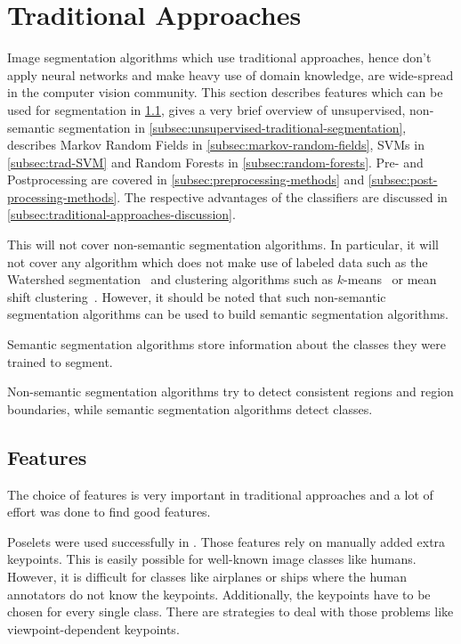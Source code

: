 
\newcommand\independent{\protect\mathpalette{\protect\independenT}{\perp}}
\def\independenT#1#2{\mathrel{\rlap{$#1#2$}\mkern2mu{#1#2}}}

\section{Traditional Approaches}\label{sec:traditional-approaches}%
Image segmentation algorithms which use traditional approaches, hence don't
apply neural networks and make heavy use of domain knowledge, are wide-spread
in the computer vision community. This section describes features which can be
used for segmentation in \cref{subsec:features}, gives a very brief overview of
unsupervised, non-semantic segmentation in
\cref{subsec:unsupervised-traditional-segmentation}, describes Markov Random
Fields in \cref{subsec:markov-random-fields}, \glspl{SVM} in
\cref{subsec:trad-SVM} and Random Forests in \cref{subsec:random-forests}.
Pre- and Postprocessing are covered in \cref{subsec:preprocessing-methods} and
\cref{subsec:post-processing-methods}. The respective advantages of the
classifiers are discussed in \cref{subsec:traditional-approaches-discussion}.

This will not cover non-semantic segmentation algorithms. In particular, it
will not cover any algorithm which does not make use of labeled data such as
the Watershed segmentation~\cite{beucher1992morphological} and clustering
algorithms such as $k$-means~\cite{hartigan1975clustering} or mean shift
clustering~\cite{comaniciu2002mean}. However, it should be noted that such
non-semantic segmentation algorithms can be used to build semantic segmentation
algorithms.

Semantic segmentation algorithms store information about the classes they were
trained to segment.

Non-semantic segmentation algorithms try to detect consistent regions and
region boundaries, while semantic segmentation algorithms detect classes.


\subsection{Features}\label{subsec:features}%
The choice of features is very important in traditional approaches and a lot
of effort was done to find good features.

Poselets were used successfully in \cite{bourdev2010detecting,brox2011object}.
Those features rely on manually added extra keypoints. This is easily possible
for well-known image classes like humans. However, it is difficult for classes
like airplanes or ships where the human annotators do not know the keypoints.
Additionally, the keypoints have to be chosen for every single class. There are
strategies to deal with those problems like viewpoint-dependent keypoints.

